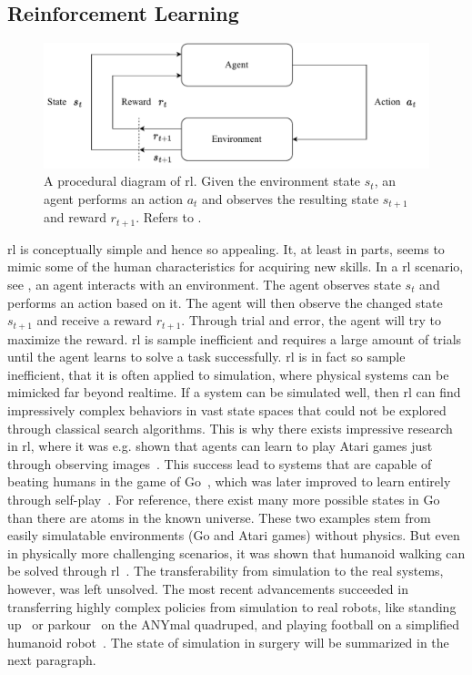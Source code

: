 \subsection{Reinforcement Learning}
\label{in:sec:reinforcement_learning}
\begin{figure}[htb]
    \centering
    \includegraphics[width=\textwidth]{introduction/fig/reinforcement_learning.pdf}
    \caption{A procedural diagram of \gls{rl}. Given the environment state $s_t$, an agent performs an action $a_t$ and observes the resulting state $s_{t+1}$ and reward $r_{t+1}$. Refers to .}
    \label{in:fig:reinforcement_learning}
\end{figure}
\gls{rl} is conceptually simple and hence so appealing. It, at least in parts, seems to mimic some of the human characteristics for acquiring new skills. In a \gls{rl} scenario, see , an agent interacts with an environment. The agent observes state $s_t$ and performs an action based on it. The agent will then observe the changed state $s_{t+1}$ and receive a reward $r_{t+1}$. Through trial and error, the agent will try to maximize the reward. \gls{rl} is sample inefficient and requires a large amount of trials until the agent learns to solve a task successfully. \gls{rl} is in fact so sample inefficient, that it is often applied to simulation, where physical systems can be mimicked far beyond realtime. If a system can be simulated well, then \gls{rl} can find impressively complex behaviors in vast state spaces that could not be explored through classical search algorithms. This is why there exists impressive research in \gls{rl}, where it was e.g. shown that agents can learn to play Atari games just through observing images~\cite{mnih2013playing}. This success lead to systems that are capable of beating humans in the game of Go~\cite{silver2016mastering}, which was later improved to learn entirely through self-play~\cite{silver2017mastering}. For reference, there exist many more possible states in Go than there are atoms in the known universe. These two examples stem from easily simulatable environments (Go and Atari games) without physics. But even in physically more challenging scenarios, it was shown that humanoid walking can be solved through \gls{rl}~\cite{schulman2017proximal}. The transferability from simulation to the real systems, however, was left unsolved. The most recent advancements succeeded in transferring highly complex policies from simulation to real robots, like standing up~\cite{rudin2022learning} or parkour~\cite{hoeller2023anymal} on the ANYmal quadruped, and playing football on a simplified humanoid robot~\cite{liu2022motor}. The state of simulation in surgery will be summarized in the next paragraph.


